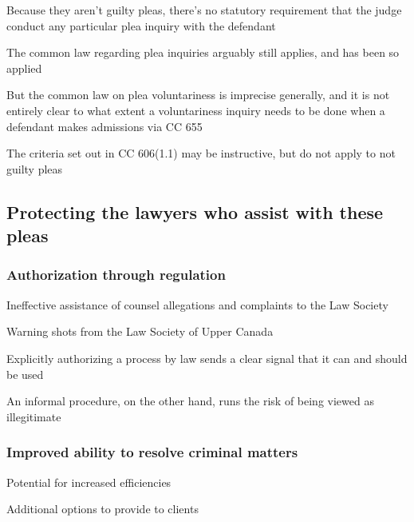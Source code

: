 Because they aren't guilty pleas, there's no statutory requirement that the judge conduct any particular plea inquiry with the defendant

The common law regarding plea inquiries arguably still applies, and has been so applied

But the common law on plea voluntariness is imprecise generally, and it is not entirely clear to what extent a voluntariness inquiry needs to be done when a defendant makes admissions via CC 655

The criteria set out in CC 606(1.1) may be instructive, but do not apply to not guilty pleas

\subsection{Protecting the lawyers who assist with these pleas}

\subsubsection{Authorization through regulation}

Ineffective assistance of counsel allegations and complaints to the Law Society

Warning shots from the Law Society of Upper Canada

Explicitly authorizing a process by law sends a clear signal that it can and should be used

An informal procedure, on the other hand, runs the risk of being viewed as illegitimate

\subsubsection{Improved ability to resolve criminal matters}

Potential for increased efficiencies

Additional options to provide to clients
